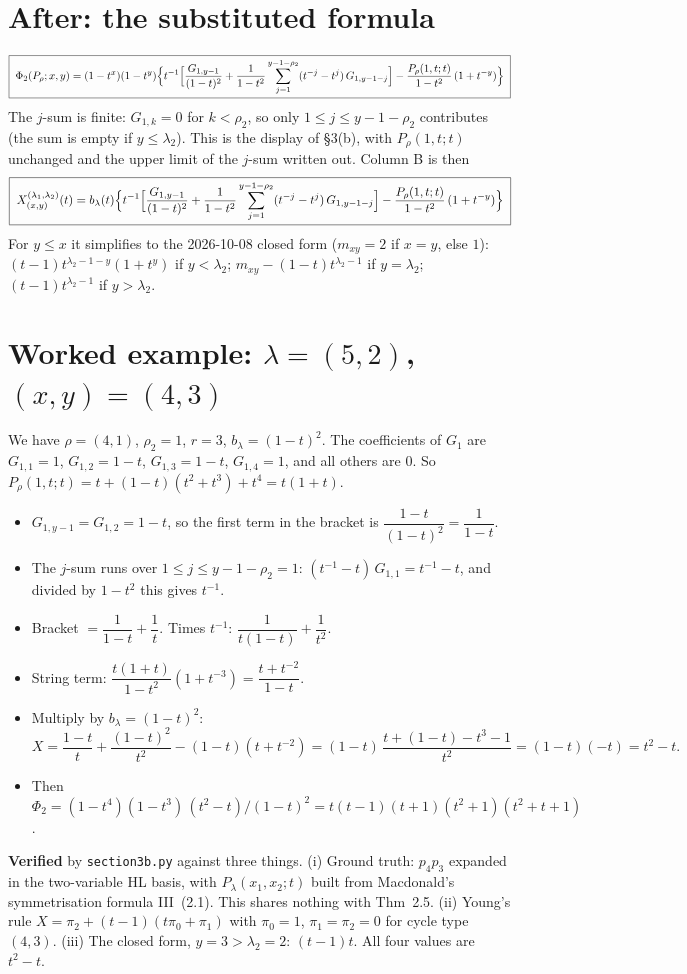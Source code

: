 \documentclass[10pt]{article}
\begin{document}
\section{After: the substituted formula}
\[
\boxed{\;
\Phi_2(P_\rho;x,y)=(1-t^x)(1-t^y)\Bigl\{t^{-1}\Bigl[\frac{G_{1,y-1}}{(1-t)^2}+\frac{1}{1-t^2}\sum_{j=1}^{y-1-\rho_2}(t^{-j}-t^{j})\,G_{1,y-1-j}\Bigr]-\frac{P_\rho(1,t;t)}{1-t^2}\,(1+t^{-y})\Bigr\}\;}
\]
The $j$-sum is finite: $G_{1,k}=0$ for $k<\rho_2$, so only $1\le j\le y-1-\rho_2$ contributes (the sum is empty if $y\le\lambda_2$).
This is the display of \S3(b), with $P_\rho(1,t;t)$ unchanged and the upper limit of the $j$-sum written out.
Column B is then
\[
\boxed{\;X^{(\lambda_1,\lambda_2)}_{(x,y)}(t)=b_\lambda(t)\Bigl\{t^{-1}\Bigl[\frac{G_{1,y-1}}{(1-t)^2}+\frac{1}{1-t^2}\sum_{j=1}^{y-1-\rho_2}(t^{-j}-t^{j})\,G_{1,y-1-j}\Bigr]-\frac{P_\rho(1,t;t)}{1-t^2}\,(1+t^{-y})\Bigr\}\;}
\]
For $y\le x$ it simplifies to the 2026-10-08 closed form ($m_{xy}=2$ if $x=y$, else $1$):
$(t-1)t^{\lambda_2-1-y}(1+t^y)$ if $y<\lambda_2$; $m_{xy}-(1-t)t^{\lambda_2-1}$ if $y=\lambda_2$; $(t-1)t^{\lambda_2-1}$ if $y>\lambda_2$.

\section{Worked example: $\lambda=(5,2)$, $(x,y)=(4,3)$}
We have $\rho=(4,1)$, $\rho_2=1$, $r=3$, $b_\lambda=(1-t)^2$. The coefficients of $G_1$ are
$G_{1,1}=1$, $G_{1,2}=1-t$, $G_{1,3}=1-t$, $G_{1,4}=1$, and all others are $0$.
So $P_\rho(1,t;t)=t+(1-t)(t^2+t^3)+t^4=t(1+t)$.
\begin{itemize}
\item $G_{1,y-1}=G_{1,2}=1-t$, so the first term in the bracket is $\dfrac{1-t}{(1-t)^2}=\dfrac1{1-t}$.
\item The $j$-sum runs over $1\le j\le y-1-\rho_2=1$: $(t^{-1}-t)\,G_{1,1}=t^{-1}-t$, and divided by $1-t^2$ this gives $t^{-1}$.
\item Bracket $=\dfrac1{1-t}+\dfrac1t$. Times $t^{-1}$: $\dfrac{1}{t(1-t)}+\dfrac1{t^2}$.
\item String term: $\dfrac{t(1+t)}{1-t^2}(1+t^{-3})=\dfrac{t+t^{-2}}{1-t}$.
\item Multiply by $b_\lambda=(1-t)^2$:
$X=\dfrac{1-t}{t}+\dfrac{(1-t)^2}{t^2}-(1-t)(t+t^{-2})
=(1-t)\,\dfrac{t+(1-t)-t^3-1}{t^2}=(1-t)(-t)=t^2-t.$
\item Then $\Phi_2=(1-t^4)(1-t^3)\,(t^2-t)/(1-t)^2=t(t-1)(t+1)(t^2+1)(t^2+t+1)$.
\end{itemize}
\textbf{Verified} by \texttt{section3b.py} against three things.
(i) Ground truth: $p_4p_3$ expanded in the two-variable HL basis, with $P_\lambda(x_1,x_2;t)$ built from Macdonald's symmetrisation formula III~(2.1). This shares nothing with Thm~2.5.
(ii) Young's rule $X=\pi_2+(t-1)(t\pi_0+\pi_1)$ with $\pi_0=1$, $\pi_1=\pi_2=0$ for cycle type $(4,3)$.
(iii) The closed form, $y=3>\lambda_2=2$: $(t-1)t$.
All four values are $t^2-t$.
\end{document}
